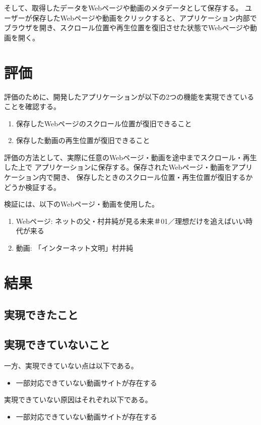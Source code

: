 \documentclass[a4j,10pt]{jsarticle}
\begin{document}
そして、取得したデータをWebページや動画のメタデータとして保存する。
ユーザーが保存したWebページや動画をクリックすると、アプリケーション内部で
ブラウザを開き、スクロール位置や再生位置を復旧させた状態でWebページや動画を開く。


\section{評価}
評価のために、開発したアプリケーションが以下の2つの機能を実現できていることを確認する。
\begin{enumerate}
\item 保存したWebページのスクロール位置が復旧できること
\item 保存した動画の再生位置が復旧できること
\end{enumerate}

評価の方法として、実際に任意のWebページ・動画を途中までスクロール・再生した上で
アプリケーションに保存する。保存されたWebページ・動画をアプリケーション内で開き、
保存したときのスクロール位置・再生位置が復旧するかどうか検証する。

検証には、以下のWebページ・動画を使用した。
\begin{enumerate}
\item Webページ: ネットの父・村井純が見る未来＃01／理想だけを追えばいい時代が来る\cite{murai-web-page}
\item 動画: 「インターネット文明」村井純\cite{murai-video}
\end{enumerate}

\section{結果}
\subsection{実現できたこと}

\subsection{実現できていないこと}
一方、実現できていない点は以下である。
\begin{itemize}
\item 一部対応できていない動画サイトが存在する
\end{itemize}

実現できていない原因はそれぞれ以下である。
\begin{itemize}
\item 一部対応できていない動画サイトが存在する
\end{itemize}



\end{document}
